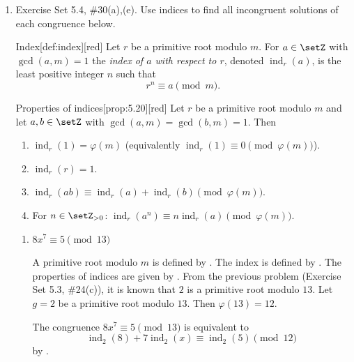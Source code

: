 \begin{enumerate}
  \newpage
  \item Exercise Set 5.4, \#30(a),(e). Use indices to find all incongruent solutions of each congruence below.
  \begin{define}{Index}[def:index][red]
  Let $r$ be a primitive root modulo $m$. For $a\in\setZ$ with $\gcd(a,m)=1$ the \emph{index of $a$ with respect to $r$}, denoted $\operatorname{ind}_r(a)$, is the least positive integer $n$ such that
  \[
  r^n\equiv a\pmod m.
  \]
  \end{define}
  \begin{define}{Properties of indices}[prop:5.20][red]
  Let $r$ be a primitive root modulo $m$ and let $a,b\in\setZ$ with $\gcd(a,m)=\gcd(b,m)=1$. Then
  \begin{enumerate}
    \item $\operatorname{ind}_r(1)=\varphi(m)$ (equivalently $\operatorname{ind}_r(1)\equiv 0\pmod{\varphi(m)}$).
    \item $\operatorname{ind}_r(r)=1$.
    \item $\operatorname{ind}_r(ab)\equiv \operatorname{ind}_r(a)+\operatorname{ind}_r(b)\pmod{\varphi(m)}$.
    \item For $n\in\setZ_{>0}$: $\operatorname{ind}_r(a^n)\equiv n\operatorname{ind}_r(a)\pmod{\varphi(m)}$.
  \end{enumerate}
  \end{define}
  \begin{enumerate}
    \item $8x^7 \equiv 5 \pmod{13}$
    \begin{subanswer}
      A primitive root modulo $m$ is defined by .
      The index is defined by .
      The properties of indices are given by .
      From the previous problem (Exercise Set 5.3, \#24(c)), it is known that $2$ is a primitive root modulo $13$.
      Let $g = 2$ be a primitive root modulo $13$. Then $\varphi(13) = 12$.
      
      The congruence $8x^7 \equiv 5 \pmod{13}$ is equivalent to
      \[
      \operatorname{ind}_2(8) + 7\operatorname{ind}_2(x) \equiv \operatorname{ind}_2(5) \pmod{12}
      \]
      by .
      

\end{subanswer}
\end{enumerate}
\end{enumerate}
